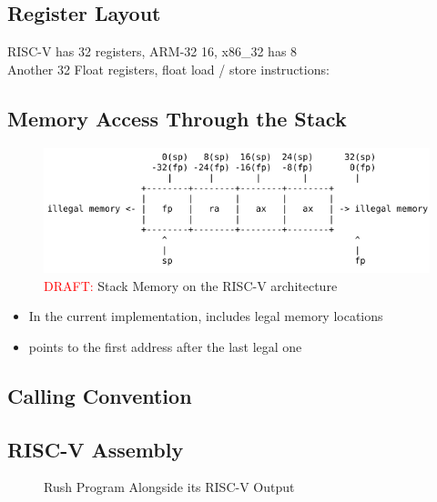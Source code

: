 \subsection{Register Layout}


RISC-V has 32 registers, ARM-32 16, x86\_32 has 8\\
Another 32 Float registers, float load / store instructions: \cite[pp.~48f.]{Patterson2017}

\subsection{Memory Access Through the Stack}

\begin{figure}[h]
	\includegraphics[width=\textwidth]{./riscv_stack_draft.png}
	\caption{\textcolor{red}{DRAFT:} Stack Memory on the RISC-V architecture}\label{fig:riscv_stack}
\end{figure}

\begin{itemize}
	\item In the current implementation,  includes legal memory locations
	\item {} points to the first address after the last legal one
\end{itemize}

\subsection{Calling Convention}

\subsection{RISC-V Assembly}

\noindent
\begin{figure}[h]
	\begin{minipage}{.4\textwidth}
	\end{minipage}%
	\begin{minipage}{.6\textwidth}
	\end{minipage}
	\caption{Rush Program Alongside its RISC-V Output}\label{fig:rush_riscv_split}
\end{figure}


